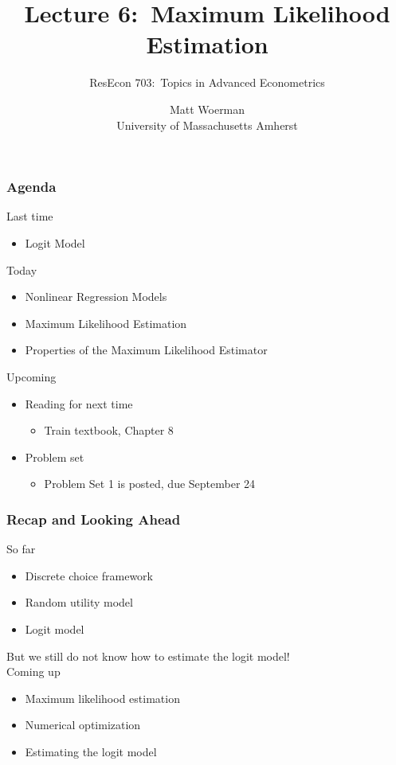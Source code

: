 \documentclass{beamer}
\title[Lecture 6:\ Maximum Likelihood Estimation]{Lecture 6:\ Maximum Likelihood Estimation}
\author[ResEcon 703:\ Advanced Econometrics]{ResEcon 703:\ Topics in Advanced Econometrics}
\date{Matt Woerman\\University of Massachusetts Amherst}
\begin{document}
{ 
\begin{frame}[noframenumbering]
    \titlepage
\end{frame}
}

\begin{frame}\frametitle{Agenda}
    Last time
    \begin{itemize}
        \item Logit Model
    \end{itemize}
    \vspace{2ex}
    Today
    \begin{itemize}
    	\item Nonlinear Regression Models
        \item Maximum Likelihood Estimation
        \item Properties of the Maximum Likelihood Estimator
    \end{itemize}
    \vspace{2ex}
    Upcoming
    \begin{itemize}
        \item Reading for next time
        \begin{itemize}
            \item Train textbook, Chapter 8
        \end{itemize}
        \item Problem set
        \begin{itemize}
            \item Problem Set 1 is posted, due September 24
        \end{itemize}
    \end{itemize}
\end{frame}

\begin{frame}\frametitle{Recap and Looking Ahead}
    So far
    \begin{itemize}
        \item Discrete choice framework
        \item Random utility model
        \item Logit model
    \end{itemize}
    \vspace{3ex}
    But we still do not know how to estimate the logit model! \\
    \vspace{3ex}
    Coming up
    \begin{itemize}
        \item Maximum likelihood estimation
        \item Numerical optimization
        \item Estimating the logit model
    \end{itemize}
\end{frame}
\end{document}
